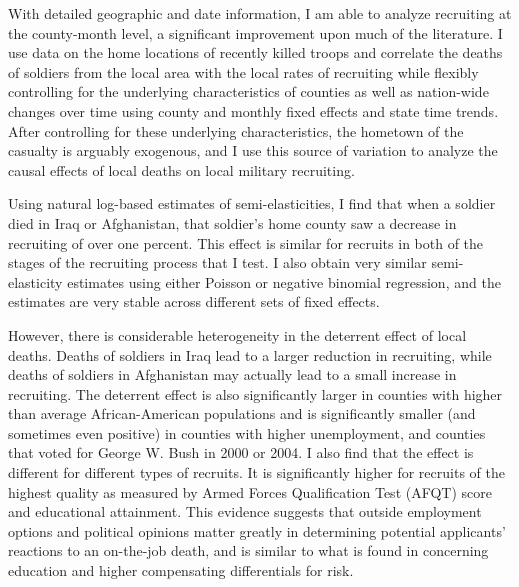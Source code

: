 \documentclass[12pt] {article}
\begin{document}
With detailed geographic and date information, I am able to analyze recruiting at the county-month level, a significant improvement upon much of the literature. I use data on the home locations of recently killed troops and correlate the deaths of soldiers from the local area with the local rates of recruiting while flexibly controlling for the underlying characteristics of counties as well as nation-wide changes over time using county and monthly fixed effects and state time trends. After controlling for these underlying characteristics, the hometown of the casualty is arguably exogenous, and I use this source of variation to analyze the causal effects of local deaths on local military recruiting. 

Using natural log-based estimates of semi-elasticities, I
find that when a soldier died in Iraq or Afghanistan, that soldier's
home county saw a decrease in recruiting of over one percent. This
effect is similar for recruits in both of the stages of the recruiting
process that I test. I also obtain very similar semi-elasticity estimates
using either Poisson or negative binomial regression, and the estimates are very stable across different sets of fixed effects. %

However, there is considerable heterogeneity in the deterrent effect of local deaths. Deaths of soldiers in Iraq lead to a larger reduction in recruiting, while deaths of soldiers in Afghanistan may actually lead to a small increase in recruiting. The deterrent effect is also significantly larger in counties with higher than average African-American populations and is significantly smaller (and sometimes even positive) in counties with higher unemployment, and counties that voted for George W. Bush in 2000 or 2004. I also find that the effect is different for different types of recruits. %
It is significantly higher for recruits of the highest quality as measured by Armed Forces Qualification Test (AFQT) score and educational attainment. This evidence suggests that outside employment options and political opinions matter greatly in determining potential applicants' reactions to an on-the-job death, and is similar to what is found in \cite{kahn1987occupational} concerning education and higher compensating differentials for risk.


\end{document}
